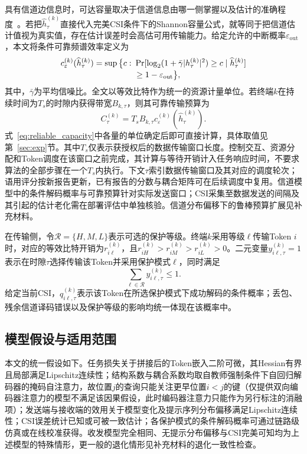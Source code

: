 \documentclass[journal]{IEEEtran}
\begin{document}
具有信道边信息时，可达容量取决于信道信息由哪一侧掌握以及估计的准确程度~\cite{goldsmith1997capacity,medard2000imperfect}。若把$\widehat h_{\tau}^{(k)}$直接代入完美CSI条件下的Shannon容量公式，就等同于把信道估计值视为真实值，存在估计误差时会高估可用传输能力。给定允许的中断概率$\varepsilon_{\mathrm{out}}$，本文将条件可靠频谱效率定义为
\begin{align}
c_{\varepsilon}^{(k)}(\widehat h_{\tau}^{(k)})
=\sup\big\{c:~&\Pr[\log_2(1+\bar\gamma|h_{\tau}^{(k)}|^2)\geq c
\mid \widehat h_{\tau}^{(k)}]
\notag\\[-0.2em]
&\geq 1-\varepsilon_{\mathrm{out}}\big\},
\label{eq:reliable_spectral_efficiency}
\end{align}
其中，$\bar\gamma$为平均信噪比。全文以等效比特作为统一的资源计量单位。若终端$k$在持续时间为$T_s$的时隙内获得带宽$B_{k,\tau}$，则其可靠传输预算为
\begin{equation}
C_{\tau}^{(k)}
=T_sB_{k,\tau}c_{\varepsilon}^{(k)}(\widehat h_{\tau}^{(k)}).
\label{eq:reliable_capacity}
\end{equation}
式~\eqref{eq:reliable_capacity}中各量的单位确定后即可直接计算，具体取值见第~\ref{sec:exp}节。其中$T_s$仅表示获授权后的数据传输窗口长度。控制交互、资源分配和Token调度在该窗口之前完成，其计算与等待开销计入任务响应时间，不要求算法的全部步骤在一个$T_s$内执行。下文$\tau$索引数据传输窗口及其对应的调度轮次；语用评分按新报告更新，已有报告的分数与耦合矩阵可在后续调度中复用。信道模型中的条件解码概率与可靠预算针对实际发送窗口；CSI采集至数据发送的间隔及其引起的估计老化需在部署评估中单独核验。信道分布偏移下的鲁棒预算扩展见补充材料。

在传输侧，令$\mathcal R=\{H,M,L\}$表示可选的保护等级。终端$k$采用等级$\ell$传输Token $i$时，对应的等效比特开销为$r_{i\ell}^{(k)}$，且$r_{iH}^{(k)}>r_{iM}^{(k)}>r_{iL}^{(k)}>0$。二元变量$y_{i\ell,\tau}^{(k)}=1$表示在时隙$\tau$选择传输该Token并采用保护模式$\ell$，同时满足
\begin{equation}
\sum_{\ell\in\mathcal R}y_{i\ell,\tau}^{(k)}\leq 1.
\label{eq:one_mode}
\end{equation}
给定当前CSI，$q_{i\ell,\tau}^{(k)}$表示该Token在所选保护模式下成功解码的条件概率；丢包、残余信道译码错误以及保护等级的影响均统一体现在该概率中。

\subsection{模型假设与适用范围}

本文的统一假设如下。任务损失关于拼接后的Token嵌入二阶可微，其Hessian有界且局部满足Lipschitz连续性；结构系数与耦合系数均取自教师强制条件下自回归解码器的掩码自注意力，故位置$j$的查询只能关注更早位置$i<j$的键（仅提供双向编码器注意力的模型不满足该因果假设，此时编码器注意力只能作为另行标注的消融项）；发送端与接收端的效用关于模型变化及提示序列分布偏移满足Lipschitz连续性；CSI误差统计已知或可被一致估计；各保护模式的条件解码概率可通过链路级仿真或在线校准获得。收发模型完全相同、无提示分布偏移与CSI完美可知均为上述模型的特殊情形，更一般的退化情形见补充材料的退化一致性检查。
\end{document}
